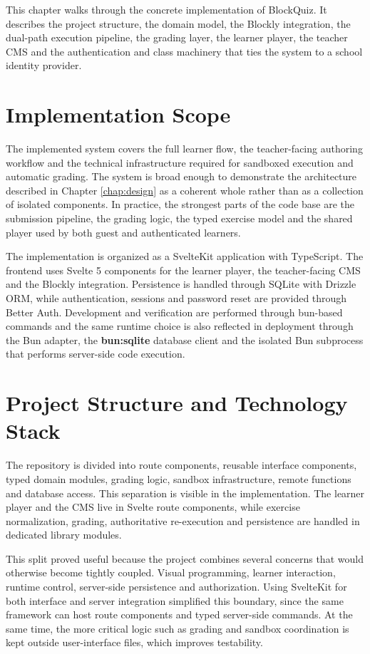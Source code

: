 This chapter walks through the concrete implementation of BlockQuiz. It describes the project structure,
the domain model, the Blockly integration, the dual-path execution pipeline, the grading layer, the learner player,
the teacher CMS and the authentication and class machinery that ties the system to a school identity provider.

\section{Implementation Scope}
\label{sec:implementation-scope}
The implemented system covers the full learner flow, the teacher-facing authoring workflow and the
technical infrastructure required for sandboxed execution and automatic grading.
The system is broad enough to demonstrate the architecture described in Chapter \ref{chap:design} as a
coherent whole rather than as a collection of isolated components.
In practice, the strongest parts of the code base are the submission pipeline, the grading logic,
the typed exercise model and the shared player used by both guest and authenticated learners.

The implementation is organized as a SvelteKit application with TypeScript.
The frontend uses Svelte 5 components for the learner player, the teacher-facing CMS and the
Blockly integration. Persistence is handled through SQLite with Drizzle ORM, while authentication,
sessions and password reset are provided through Better Auth. Development and verification are
performed through bun-based commands and the same runtime choice is also reflected in deployment
through the Bun adapter, the \textbf{bun:sqlite} database client
and the isolated Bun subprocess that performs server-side code execution.

\section{Project Structure and Technology Stack}
\label{sec:project-structure}
The repository is divided into route components, reusable interface components, typed domain modules,
grading logic, sandbox infrastructure,
remote functions and database access.
This separation is visible in the implementation.
The learner player and the CMS live in Svelte route components, while exercise normalization,
grading, authoritative re-execution and persistence are
handled in dedicated library modules.

This split proved useful because the project combines several concerns that would otherwise
become tightly coupled. Visual programming, learner interaction, runtime control, server-side
persistence and authorization.
Using SvelteKit for both interface and server integration simplified this boundary, since the same
framework can host route components and typed server-side commands.
At the same time, the more critical logic such as grading and sandbox coordination is kept outside
user-interface files, which improves testability.

